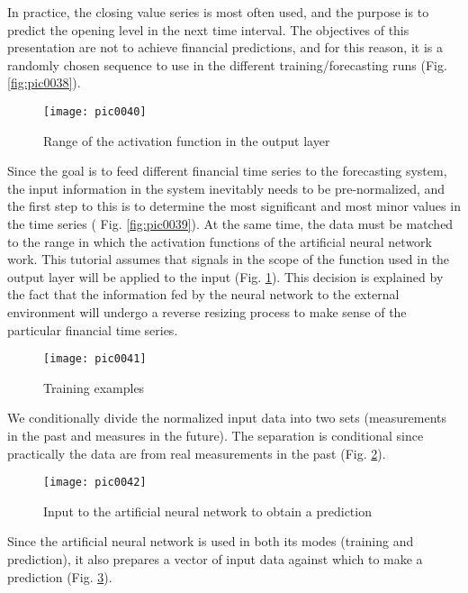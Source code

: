 In practice, the closing value series is most often used, and the purpose is to predict the opening level in the next time interval. The objectives of this presentation are not to achieve financial predictions, and for this reason, it is a randomly chosen sequence to use in the different training/forecasting runs (Fig. \ref{fig:pic0038}).

\begin{figure}[h]
\centering
\texttt{[image: pic0040]}
\caption{Range of the activation function in the output layer}
\label{fig:pic0040}
\end{figure}
\FloatBarrier

Since the goal is to feed different financial time series to the forecasting system, the input information in the system inevitably needs to be pre-normalized, and the first step to this is to determine the most significant and most minor values in the time series ( Fig. \ref{fig:pic0039}). At the same time, the data must be matched to the range in which the activation functions of the artificial neural network work. This tutorial assumes that signals in the scope of the function used in the output layer will be applied to the input (Fig. \ref{fig:pic0040}). This decision is explained by the fact that the information fed by the neural network to the external environment will undergo a reverse resizing process to make sense of the particular financial time series.

\begin{figure}[h]
\centering
\texttt{[image: pic0041]}
\caption{Training examples}
\label{fig:pic0041}
\end{figure}
\FloatBarrier

We conditionally divide the normalized input data into two sets (measurements in the past and measures in the future). The separation is conditional since practically the data are from real measurements in the past (Fig. \ref{fig:pic0041}).

\begin{figure}[h]
\centering
\texttt{[image: pic0042]}
\caption{Input to the artificial neural network to obtain a prediction}
\label{fig:pic0042}
\end{figure}
\FloatBarrier

Since the artificial neural network is used in both its modes (training and prediction), it also prepares a vector of input data against which to make a prediction (Fig. \ref{fig:pic0042}).

